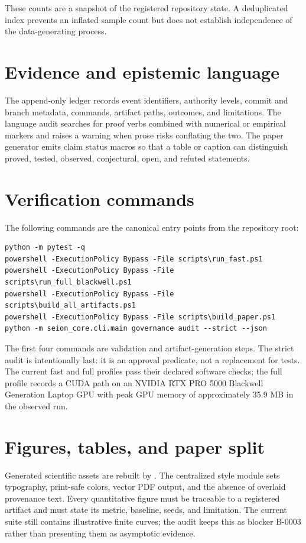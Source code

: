 \documentclass[11pt]{article}
\begin{document}
These counts are a snapshot of the registered repository state. A deduplicated index prevents an inflated sample count but does not establish independence of the data-generating process.

\section{Evidence and epistemic language}

The append-only ledger  records event identifiers, authority levels, commit and branch metadata, commands, artifact paths, outcomes, and limitations. The language audit searches for proof verbs combined with numerical or empirical markers and raises a warning when prose risks conflating the two. The paper generator emits claim status macros so that a table or caption can distinguish proved, tested, observed, conjectural, open, and refuted statements.

\section{Verification commands}

The following commands are the canonical entry points from the repository root:
\begin{verbatim}
python -m pytest -q
powershell -ExecutionPolicy Bypass -File scripts\run_fast.ps1
powershell -ExecutionPolicy Bypass -File scripts\run_full_blackwell.ps1
powershell -ExecutionPolicy Bypass -File scripts\build_all_artifacts.ps1
powershell -ExecutionPolicy Bypass -File scripts\build_paper.ps1
python -m seion_core.cli.main governance audit --strict --json
\end{verbatim}

The first four commands are validation and artifact-generation steps. The strict audit is intentionally last: it is an approval predicate, not a replacement for tests. The current fast and full profiles pass their declared software checks; the full profile records a CUDA path on an NVIDIA RTX PRO 5000 Blackwell Generation Laptop GPU with peak GPU memory of approximately 35.9 MB in the observed run.

\section{Figures, tables, and paper split}

Generated scientific assets are rebuilt by . The centralized style module  sets typography, print-safe colors, vector PDF output, and the absence of overlaid provenance text. Every quantitative figure must be traceable to a registered artifact and must state its metric, baseline, seeds, and limitation. The current suite still contains illustrative finite curves; the audit keeps this as blocker B-0003 rather than presenting them as asymptotic evidence.
\end{document}
